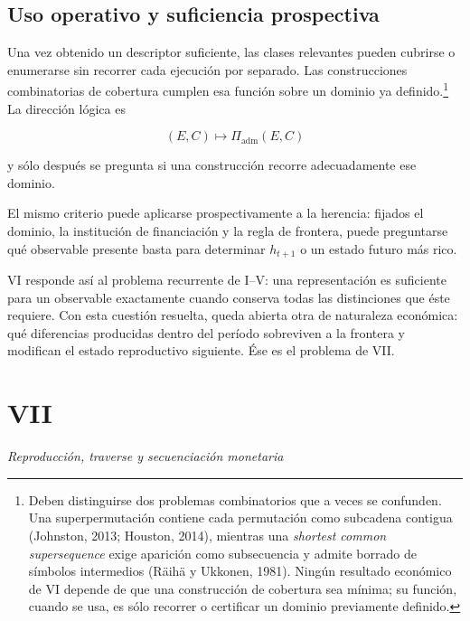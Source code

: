 \documentclass[10pt,a5paper,twoside]{article}
\begin{document}
\subsection{Uso operativo y suficiencia prospectiva}\label{uso-operativo-y-suficiencia-prospectiva}

Una vez obtenido un descriptor suficiente, las clases relevantes pueden
cubrirse o enumerarse sin recorrer cada ejecución por separado. Las construcciones combinatorias de cobertura cumplen esa función sobre un
dominio ya definido.\footnote{Deben distinguirse dos problemas combinatorios
  que a veces se confunden. Una superpermutación contiene cada
  permutación como subcadena contigua (Johnston, 2013; Houston, 2014),
  mientras una \emph{shortest common supersequence} exige aparición como
  subsecuencia y admite borrado de símbolos intermedios (Räihä y
  Ukkonen, 1981). Ningún resultado económico de VI depende de que una
  construcción de cobertura sea mínima; su función, cuando se usa, es
  sólo recorrer o certificar un dominio previamente definido.} La
dirección lógica es

\[
(E,C)\mapsto\Pi_{\mathrm{adm}}(E,C)
\]

y sólo después se pregunta si una construcción recorre adecuadamente ese
dominio.

El mismo criterio puede aplicarse prospectivamente a la herencia: fijados
el dominio, la institución de financiación y la regla de frontera, puede
preguntarse qué observable presente basta para determinar \(h_{t+1}\) o un
estado futuro más rico.

VI responde así al problema recurrente de I--V: una representación es
suficiente para un observable exactamente cuando conserva todas las
distinciones que éste requiere. Con esta cuestión resuelta, queda abierta
otra de naturaleza económica: qué diferencias producidas dentro del
período sobreviven a la frontera y modifican el estado reproductivo
siguiente. Ése es el problema de VII.


\cleardoublepage
\setcounter{subsection}{0}
\vspace*{6mm}\section*{VII}\label{vii.-reproducciuxf3n-traverse-y-secuenciaciuxf3n-monetaria}
\thispagestyle{plain}
{\large\itshape Reproducción, traverse y secuenciación monetaria\par}\vspace{1.2ex}
\end{document}
